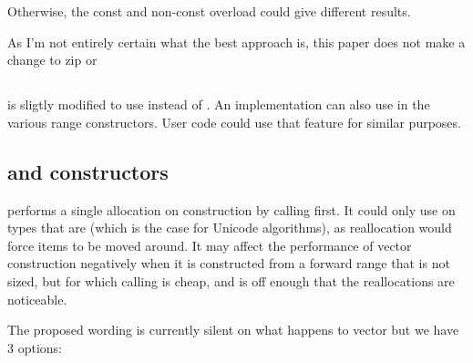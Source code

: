 \documentclass{wg21}
\begin{document}
Otherwise, the const and non-const overload could give different results.

As I'm not entirely certain what the best approach is, this paper does not make a change to zip or 

\subsection{}

 is sligtly modified to use  instead of .
An implementation can also use  in the various range constructors.
User code could use that feature for similar purposes.


\subsection{ and  constructors}

 performs a single allocation on construction by calling  first.
It could only use  on types that are  (which is the case for Unicode algorithms), as reallocation would force items to be moved around.
It may affect the performance of vector construction negatively when it is constructed from a forward range that is not sized, but for which calling  is cheap, and  is off enough that the reallocations are noticeable.

The proposed wording is currently silent on what happens to vector but we have 3 options:
\end{document}
